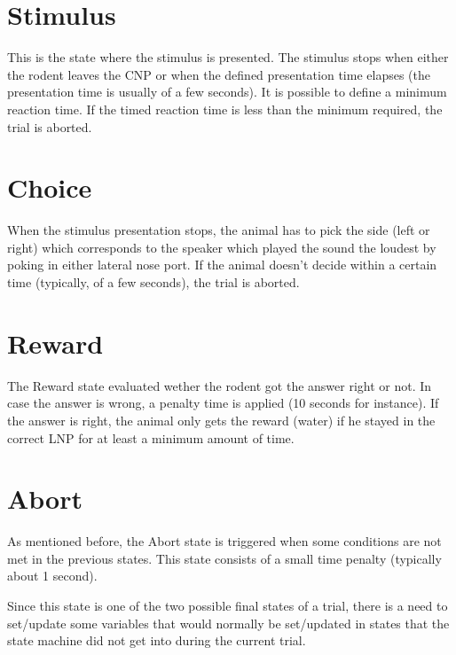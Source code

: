 \section{Stimulus}
\label{sec:stimulus}
This is the state where the stimulus is presented. The stimulus stops when either the rodent leaves the CNP or when the defined presentation time elapses (the presentation time is usually of a few seconds). It is possible to define a minimum reaction time. If the timed reaction time is less than the minimum required, the trial is aborted.

\section{Choice}
\label{sec:choice}
When the stimulus presentation stops, the animal has to pick the side (left or right) which corresponds to the speaker which played the sound the loudest by poking in either lateral nose port. If the animal doesn't decide within a certain time (typically, of a few seconds), the trial is aborted.

\section{Reward}
\label{sec:reward}
The Reward state evaluated wether the rodent got the answer right or not. In case the answer is wrong, a penalty time is applied (10 seconds for instance). If the answer is right, the animal only gets the reward (water) if he stayed in the correct LNP for at least a minimum amount of time.

\section{Abort}
\label{sec:abort}
As mentioned before, the Abort state is triggered when some conditions are not met in the previous states. This state consists of a small time penalty (typically about 1 second).

Since this state is one of the two possible final states of a trial, there is a need to set/update some variables that would normally be set/updated in states that the state machine did not get into during the current trial.



